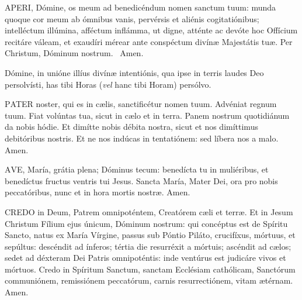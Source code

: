 


\lettrine[lines=2]{A}{PERI}, Dómine, os meum ad benedicéndum nomen sanctum tuum: munda quoque cor meum ab ómnibus vanis, pervérsis et aliénis cogitatiónibus; intelléctum illúmina, afféctum inflámma, ut digne, atténte ac devóte hoc Offícium recitáre váleam, et exaudíri mérear ante conspéctum divínæ Majestátis tuæ. Per Christum, Dóminum nostrum. \R\ Amen.

Dómine, in unióne illíus divínæ intentiónis, qua ipse in terris laudes Deo persolvísti, has tibi Horas (\textit{vel} hanc tibi Horam) persólvo.



\lettrine[lines=2]{P}{ATER} noster, qui es in cælis, sanctificétur nomen tuum. Advéniat regnum tuum. Fiat volúntas tua, sicut in cælo et in terra. Panem nostrum quotidiánum da nobis hódie. Et dimítte nobis débita nostra, sicut et nos dimíttimus debitóribus nostris. Et ne nos indúcas in tentatiónem: sed líbera nos a malo. Amen.

\lettrine[lines=2]{A}{VE}, María, grátia plena; Dóminus tecum: benedícta tu in muliéribus, et benedíctus fructus ventris tui Jesus. Sancta María, Mater Dei, ora pro nobis peccatóribus, nunc et in hora mortis nostræ. Amen.


\lettrine[lines=2]{C}{REDO} in Deum, Patrem omnipoténtem, Creatórem cæli et terræ. Et in Jesum Christum Fílium ejus únicum, Dóminum nostrum: qui concéptus est de Spíritu Sancto, natus ex María Vírgine, passus sub Póntio Piláto, crucifíxus, mórtuus, et sepúltus: descéndit ad ínferos; tértia die resurréxit a mórtuis; ascéndit ad cælos; sedet ad déxteram Dei Patris omnipoténtis: inde ventúrus est judicáre vivos et mórtuos. Credo in Spíritum Sanctum, sanctam Ecclésiam cathólicam, Sanctórum communiónem, remissiónem peccatórum, carnis resurrectiónem, vitam ætérnam. Amen.

